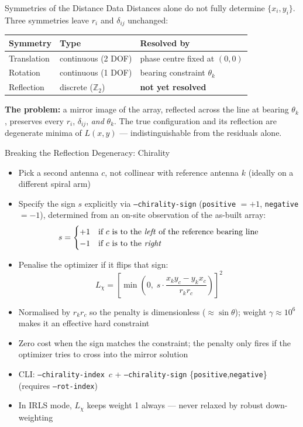 \documentclass[ignorenonframetext]{beamer}
\begin{document}
\begin{frame}{Symmetries of the Distance Data}
Distances alone do not fully determine $\{x_i, y_i\}$. Three symmetries leave $r_i$ and $\delta_{ij}$ unchanged:

\vspace{4pt}
\begin{center}
\begin{tabular}{lll}
\hline
Symmetry & Type & Resolved by \\
\hline
Translation & continuous (2 DOF) & phase centre fixed at $(0,0)$ \\
Rotation & continuous (1 DOF) & bearing constraint $\theta_k$ \\
Reflection & discrete ($\mathbb{Z}_2$) & \textbf{not yet resolved} \\
\hline
\end{tabular}
\end{center}

\vspace{8pt}
\textbf{The problem:} a mirror image of the array, reflected across the line at bearing $\theta_k$, preserves every $r_i$, $\delta_{ij}$, \emph{and} $\theta_k$. The true configuration and its reflection are degenerate minima of $L(x,y)$ --- indistinguishable from the residuals alone.
\end{frame}

\begin{frame}{Breaking the Reflection Degeneracy: Chirality}
\begin{itemize}
  \item Pick a second antenna $c$, not collinear with reference antenna $k$ (ideally on a different spiral arm)
  \item Specify the sign $s$ explicitly via \texttt{--chirality-sign} (\texttt{positive} $= +1$, \texttt{negative} $= -1$), determined from an on-site observation of the as-built array:
  \[
    s = \begin{cases} +1 & \text{if $c$ is to the \emph{left} of the reference bearing line} \\
                      -1 & \text{if $c$ is to the \emph{right}} \end{cases}
  \]
  \item Penalise the optimizer if it flips that sign:
  \[
    L_\chi = \left[ \min\!\left(0,\; s \cdot \frac{x_k y_c - y_k x_c}{r_k r_c}\right) \right]^2
  \]
  \item Normalised by $r_k r_c$ so the penalty is dimensionless ($\approx \sin\theta$); weight $\gamma \approx 10^6$ makes it an effective hard constraint
  \item Zero cost when the sign matches the constraint; the penalty only fires if the optimizer tries to cross into the mirror solution
  \item CLI: \texttt{--chirality-index}~$c$ + \texttt{--chirality-sign} \{\texttt{positive},\texttt{negative}\} (requires \texttt{--rot-index})
  \item In IRLS mode, $L_\chi$ keeps weight 1 always --- never relaxed by robust down-weighting
\end{itemize}
\end{frame}
\end{document}

